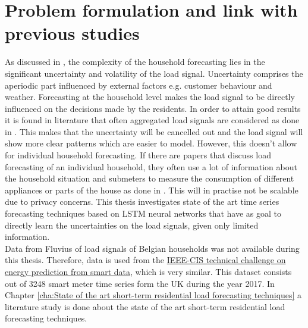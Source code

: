 \section{Problem formulation and link with previous studies}
As discussed in \cite{Shi2018}, the complexity of the household forecasting lies in the significant uncertainty and volatility of the load signal. Uncertainty comprises the aperiodic part influenced by external factors e.g. customer behaviour and weather. Forecasting at the household level makes the load signal to be directly influenced on the decisions made by the residents. In order to attain good results it is found in literature that often aggregated load signals are considered as done in \cite{loadforecastingmoor}. This makes that the uncertainty will be cancelled out and the load signal will show more clear patterns which are easier to model. However, this doesn't allow for individual household forecasting. If there are papers that discuss load forecasting of an individual household, they often use a lot of information about the household situation and submeters to measure the consumption of different appliances or parts of the house as done in \cite{Kim2019}. This will in practise not be scalable due to privacy concerns. This thesis investigates state of the art time series forecasting techniques based on LSTM neural networks that have as goal to directly learn the uncertainties on the load signals, given only limited information.\\

Data from Fluvius of load signals of Belgian households was not available during this thesis. Therefore, data is used from the \href{https://ieee-dataport.org/competitions/ieee-cis-technical-challenge-energy-prediction-smart-meter-data}{IEEE-CIS technical challenge on energy prediction from smart data}, which is very similar. This dataset consists out of 3248 smart meter time series form the UK during the year 2017. In Chapter \ref{cha:State of the art short-term residential load forecasting techniques} a literature study is done about the state of the art short-term residential load forecasting techniques. 


